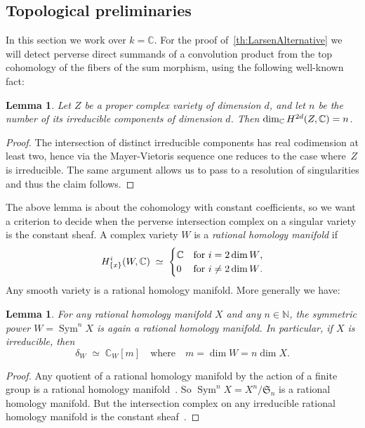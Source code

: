 \documentclass[a4paper]{amsart}
\newcommand{\bbC}{\mathbb{C}}
\newcommand{\bbN}{\mathbb{N}}
\newcommand{\rH}{\textup{H}}
\newcommand{\frS}{\mathfrak{S}}
\DeclareMathOperator{\Sym}{Sym}
\theoremstyle{plain}
\newtheorem{lemma}[theorem]{Lemma}
\theoremstyle{definition}
\numberwithin{equation}{section}
\begin{document}
\subsection{Topological preliminaries} 
In this section we work over $k=\bbC$. For the proof of~\cref{th:LarsenAlternative} we will detect perverse direct summands of a convolution product from the top cohomology of the fibers of the sum morphism, using the following well-known fact:

\begin{lemma} \label{lem:top-cohomology}
Let $Z$ be a proper complex variety of dimension $d$, and let $n$ be the number of its irreducible components of dimension $d$.
Then $\dim_\bbC \rH^{2d}(Z, \bbC)=n$.
\end{lemma}

\begin{proof} 
The intersection of distinct irreducible components has real codimension at least two, hence via the Mayer-Vietoris sequence one reduces to the case where~$Z$ is irreducible. The same argument allows us to pass to a resolution of singularities and thus the claim follows. 
\end{proof}

The above lemma is about the cohomology with constant coefficients, so we want a criterion to decide when the perverse intersection complex on a singular variety is the constant sheaf. A complex variety $W$ is a \emph{rational homology manifold} if
%
\[
 \rH^i_{\{x\}}(W, \bbC) \;\simeq\; 
 \begin{cases} 
 \bbC & \text{for $i=2\dim W$}, \\
 0 & \text{for $i\neq 2\dim W$}.
 \end{cases}
\]
%
Any smooth variety is a rational homology manifold. More generally we have:

\begin{lemma} \label{lem:homology-manifold}
For any rational homology manifold $X$ and any $n\in \bbN$, the symmetric power $W=\Sym^n X$ is again a rational homology manifold. In particular, if $X$ is irreducible, then 
%
\[
 \delta_{W} \;\simeq\; \bbC_{W}[m]
 \quad \text{where} \quad m = \dim W = n\dim X.
\]
\end{lemma} 

\begin{proof} 
Any quotient of a rational homology manifold by the action of a finite group is a rational homology manifold~\cite[prop.~A.1(iii)]{BrionRationalSmoothness}. So $\Sym^n X = X^n/\frS_n$ is a rational homology manifold. But the intersection complex on any irreducible rational homology manifold is the constant sheaf~\cite[prop.~8.2.21]{Hotta}. 
\end{proof} 
\end{document}
